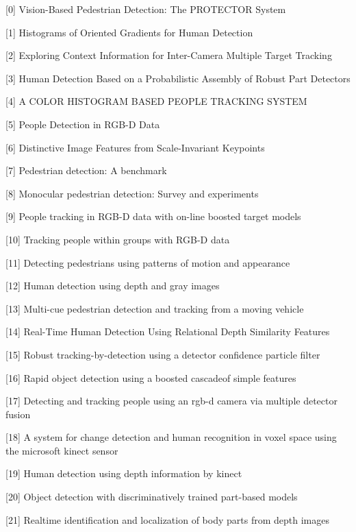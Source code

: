 \documentclass[paper=a4, fontsize=11pt]{scrartcl}
\numberwithin{equation}{section}		%
\numberwithin{figure}{section}			%
\numberwithin{table}{section}				%
\begin{document}
[0] Vision-Based Pedestrian Detection: The PROTECTOR System

[1] Histograms of Oriented Gradients for Human Detection

[2] Exploring Context Information for Inter-Camera Multiple Target Tracking

[3] Human Detection Based on a Probabilistic Assembly of Robust Part Detectors

[4] A COLOR HISTOGRAM BASED PEOPLE TRACKING SYSTEM

[5] People Detection in RGB-D Data

[6] Distinctive Image Features from Scale-Invariant Keypoints

[7] Pedestrian detection: A benchmark

[8] Monocular pedestrian detection: Survey and experiments

[9] People tracking in RGB-D data with on-line boosted target models

[10] Tracking people within groups with RGB-D data

[11] Detecting pedestrians using patterns of motion and appearance

[12] Human detection using depth and gray images

[13] Multi-cue pedestrian detection and tracking from a moving vehicle

[14] Real-Time Human Detection Using Relational Depth Similarity Features

[15] Robust tracking-by-detection using a detector confidence particle filter

[16] Rapid object detection using a boosted cascadeof simple features

[17] Detecting and tracking people using an rgb-d camera via multiple detector fusion

[18] A system for change detection and human recognition in voxel space using the microsoft kinect sensor

[19] Human detection using depth information by kinect

[20] Object detection with discriminatively trained part-based models

[21] Realtime identification and localization of body parts from depth images
\end{document}
